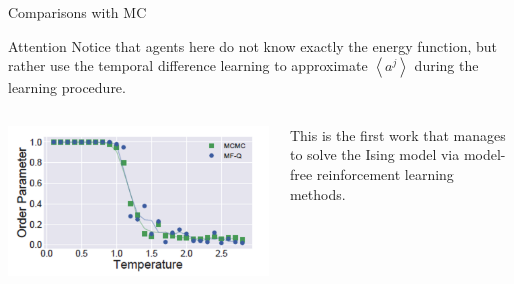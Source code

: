 \begin{frame}{Comparisons with MC}
	\begin{block}{Attention}
		Notice that agents here do not know
		exactly the energy function, but rather use the temporal
		difference learning to approximate $\left\langle a^{j}\right\rangle$ during the learning
		procedure. \nocite{DBLP:journals/corr/abs-1802-05438DBLP:journals/corr/abs-1802-05438}
	\end{block}

	\begin{columns}
		\begin{column}{0.5\textwidth}
			\centerline{\includegraphics[width = 1.1\textwidth]{Figures/co.png}}
		\end{column}
		\begin{column}{0.5\textwidth}
			This is the first work that manages to solve
			the Ising model via model-free reinforcement learning methods.
		\end{column}
	\end{columns}
	\end{frame}

